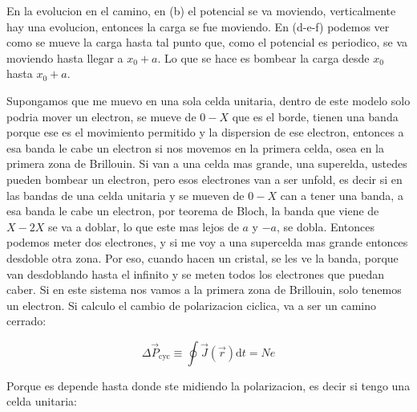 \documentclass[11pt,fleqn]{book}
\begin{document}

En la evolucion en el camino, en (b) el potencial se va moviendo, verticalmente hay una evolucion, entonces la carga se fue moviendo. En (d-e-f) podemos ver como se mueve la carga hasta tal punto que, como el potencial es periodico, se va moviendo hasta llegar a $x_{0}+a$. Lo que se hace es bombear la carga desde $x_{0}$ hasta $x_{0}+a$. 

Supongamos que me muevo en una sola celda unitaria, dentro de este modelo solo podria mover un electron, se mueve de $0-X$ que es el borde, tienen una banda porque ese es el movimiento permitido y la dispersion de ese electron, entonces a esa banda  le cabe un electron si nos movemos en la primera celda, osea en la primera zona de Brillouin. Si van a una celda mas grande, una superelda, ustedes pueden bombear un electron,  pero esos electrones van a ser unfold, es decir si en las bandas de una celda unitaria y se mueven de $0-X$ can a tener una banda, a esa banda le cabe un electron, por teorema de Bloch, la banda que viene de $X-2X$ se va a doblar, lo que este mas lejos de $a$ y $-a$, se dobla. Entonces podemos meter dos electrones,  y si me voy a una supercelda mas grande entonces desdoble otra zona. Por eso, cuando hacen un cristal, se les ve la banda, porque van desdoblando hasta el infinito y se meten todos los electrones que puedan caber. Si en este sistema nos vamos a la primera zona de Brillouin, solo tenemos un electron. Si calculo el cambio de polarizacion ciclica, va a ser un camino cerrado:

\begin{equation}
    \Delta\vec{P}_{\text{cyc}}\equiv\oint\vec{J}(\vec{r})\mathrm{d}t=Ne
\end{equation}  

Porque es depende hasta donde ste midiendo la polarizacion, es decir si tengo una celda unitaria:

\end{document}
